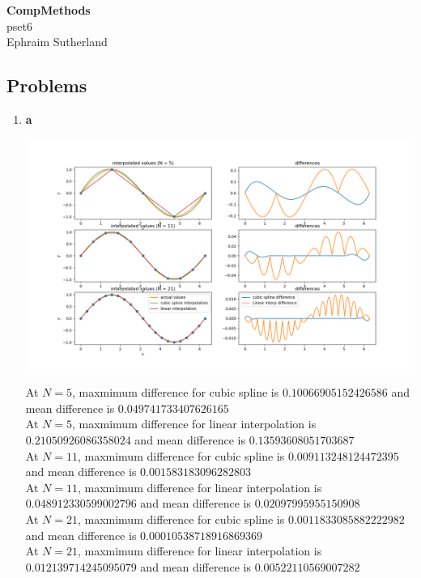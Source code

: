 \documentclass[12pt]{article}
\begin{document}
\begin{center}
{\large \bf CompMethods }   \\ \large pset6 \\ Ephraim Sutherland
\end{center}

\subsection*{Problems}

\begin{enumerate}

\item 
	\begin{center}
		\textbf{a}\par\medskip
		\includegraphics[width=0.9\linewidth]{Q1fig1.png}
	\end{center}
At $N = 5$, maxmimum difference for cubic spline is $0.10066905152426586$ and mean difference is $0.049741733407626165$
\\At $N = 5$, maxmimum difference for linear interpolation is $0.21050926086358024$ and mean difference is $0.13593608051703687$
\\At $N = 11$, maxmimum difference for cubic spline is $0.009113248124472395$ and mean difference is $0.001583183096282803$
\\At $N = 11$, maxmimum difference for linear interpolation is $0.048912330599002796$ and mean difference is $0.02097995955150908$
\\At $N = 21$, maxmimum difference for cubic spline is $0.0011833085882222982$ and mean difference is $0.00010538718916869369$
\\At $N = 21$, maxmimum difference for linear interpolation is $0.012139714245095079$ and mean difference is $0.00522110569007282$


\end{enumerate}
\end{document}

